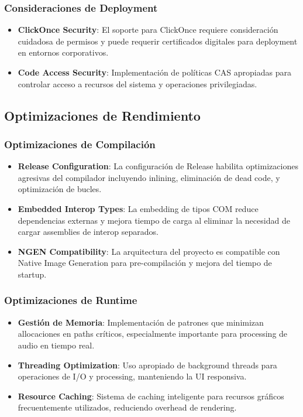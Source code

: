 \documentclass[a4paper]{article}
\begin{document}
\subsubsection{Consideraciones de Deployment}

\begin{itemize}
\item \textbf{ClickOnce Security}: El soporte para ClickOnce requiere consideración cuidadosa de permisos y puede requerir certificados digitales para deployment en entornos corporativos.

\item \textbf{Code Access Security}: Implementación de políticas CAS apropiadas para controlar acceso a recursos del sistema y operaciones privilegiadas.
\end{itemize}

\subsection{Optimizaciones de Rendimiento}

\subsubsection{Optimizaciones de Compilación}

\begin{itemize}
\item \textbf{Release Configuration}: La configuración de Release habilita optimizaciones agresivas del compilador incluyendo inlining, eliminación de dead code, y optimización de bucles.

\item \textbf{Embedded Interop Types}: La embedding de tipos COM reduce dependencias externas y mejora tiempo de carga al eliminar la necesidad de cargar assemblies de interop separados.

\item \textbf{NGEN Compatibility}: La arquitectura del proyecto es compatible con Native Image Generation para pre-compilación y mejora del tiempo de startup.
\end{itemize}

\subsubsection{Optimizaciones de Runtime}

\begin{itemize}
\item \textbf{Gestión de Memoria}: Implementación de patrones que minimizan allocaciones en paths críticos, especialmente importante para processing de audio en tiempo real.

\item \textbf{Threading Optimization}: Uso apropiado de background threads para operaciones de I/O y processing, manteniendo la UI responsiva.

\item \textbf{Resource Caching}: Sistema de caching inteligente para recursos gráficos frecuentemente utilizados, reduciendo overhead de rendering.
\end{itemize}
\end{document}
